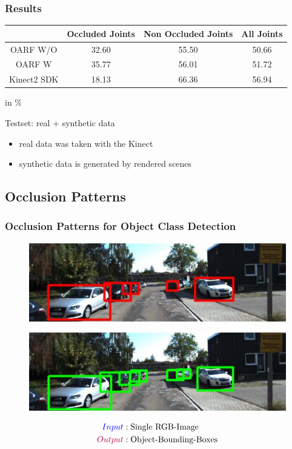 \documentclass[xcolor=dvipsnames]{beamer}
\begin{document}
\begin{frame}
	\frametitle{Results}
	
	\begin{tabular}{c|c|c|c}
		& Occluded Joints & Non Occluded Joints & All Joints \\
		\hline
		OARF W/O & 32.60 & 55.50 & 50.66 \\
		OARF W   & 35.77 & 56.01 & 51.72 \\
		Kinect2 SDK & 18.13 & 66.36 & 56.94 \\
	\end{tabular}
	\begin{center}
		in $\%$
	\end{center}
	
	\vspace{1cm}
	Testset: real + synthetic data
	\begin{itemize}
		\item real data was taken with the Kinect
		\item synthetic data is generated by rendered scenes
	\end{itemize}
\end{frame}

\subsection{Occlusion Patterns}
{
\begin{frame}
	\frametitle{Occlusion Patterns for Object Class Detection}
	\Large
	
		\begin{figure}
			\includegraphics[width=.8\textwidth]{img/p2h2.png}
		\end{figure}
		\begin{figure}	
			\includegraphics[width=.8\textwidth]{img/p2h1.png}
		\end{figure}
		
	\begin{align*}
		\textcolor{blue}{Input}&:  \text{Single RGB-Image} \\
		\textcolor{purple}{Output}&: \text{Object-Bounding-Boxes}
	\end{align*}
\end{frame}}
\end{document}
